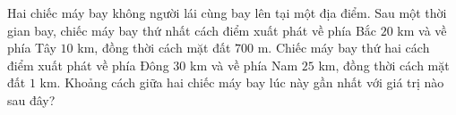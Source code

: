 \begin{ex}
Hai chiếc máy bay không người lái cùng bay lên tại một địa điểm. Sau một thời gian bay, chiếc máy bay thứ nhất cách điểm xuất phát về phía Bắc $20$ km và về phía Tây $10$ km, đồng thời cách mặt đất $700$ m. Chiếc máy bay thứ hai cách điểm xuất phát về phía Đông $30$ km và về phía Nam $25$ km, đồng thời cách mặt đất $1$ km. Khoảng cách giữa hai chiếc máy bay lúc này gần nhất với giá trị nào sau đây?
\end{ex}
